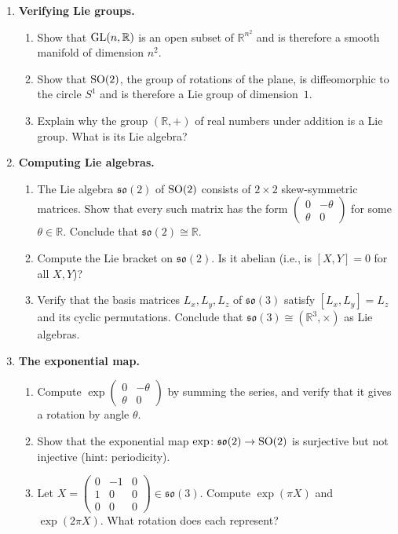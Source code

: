 \begin{enumerate}
    \item \textbf{Verifying Lie groups.}
    \begin{enumerate}
        \item Show that $\operatorname{GL}(n,\mathbb{R})$ is an open subset of $\mathbb{R}^{n^2}$ and is therefore a smooth manifold of dimension $n^2$.
        \item Show that $\operatorname{SO}(2)$, the group of rotations of the plane, is diffeomorphic to the circle $S^1$ and is therefore a Lie group of dimension~$1$.
        \item Explain why the group $(\mathbb{R}, +)$ of real numbers under addition is a Lie group. What is its Lie algebra?
    \end{enumerate}

    \item \textbf{Computing Lie algebras.}
    \begin{enumerate}
        \item The Lie algebra $\mathfrak{so}(2)$ of $\operatorname{SO}(2)$ consists of $2 \times 2$ skew-symmetric matrices. Show that every such matrix has the form $\begin{pmatrix} 0 & -\theta \\ \theta & 0 \end{pmatrix}$ for some $\theta \in \mathbb{R}$. Conclude that $\mathfrak{so}(2) \cong \mathbb{R}$.
        \item Compute the Lie bracket on $\mathfrak{so}(2)$. Is it abelian (i.e., is $[X,Y] = 0$ for all $X, Y$)?
        \item Verify that the basis matrices $L_x, L_y, L_z$ of $\mathfrak{so}(3)$ satisfy $[L_x, L_y] = L_z$ and its cyclic permutations. Conclude that $\mathfrak{so}(3) \cong (\mathbb{R}^3, \times)$ as Lie algebras.
    \end{enumerate}

    \item \textbf{The exponential map.}
    \begin{enumerate}
        \item Compute $\exp\!\begin{pmatrix} 0 & -\theta \\ \theta & 0 \end{pmatrix}$ by summing the series, and verify that it gives a rotation by angle $\theta$.
        \item Show that the exponential map $\exp \colon \mathfrak{so}(2) \to \operatorname{SO}(2)$ is surjective but not injective (hint: periodicity).
        \item Let $X = \begin{pmatrix} 0 & -1 & 0 \\ 1 & 0 & 0 \\ 0 & 0 & 0 \end{pmatrix} \in \mathfrak{so}(3)$. Compute $\exp(\pi X)$ and $\exp(2\pi X)$. What rotation does each represent?
    \end{enumerate}


\end{enumerate}
